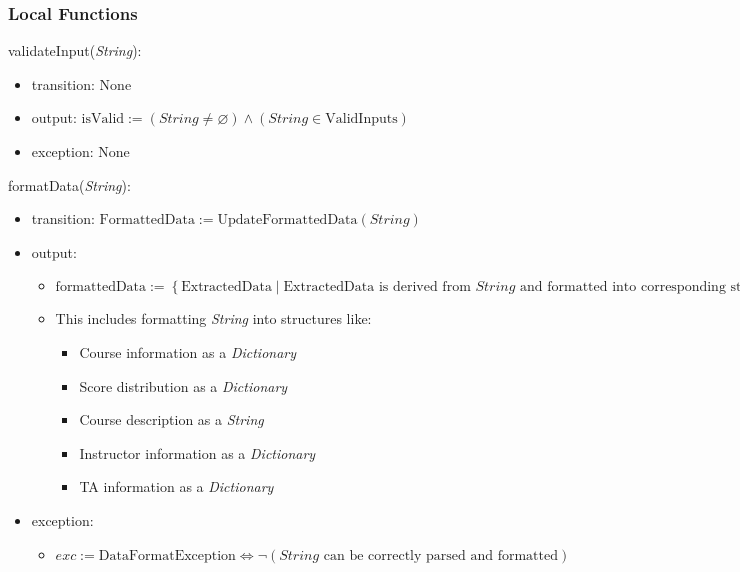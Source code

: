 \documentclass[12pt, titlepage]{article}
\begin{document}
\subsubsection{Local Functions}

\noindent validateInput(\textit{String}):
\begin{itemize}
\item transition: None
\item output: \( \text{isValid} := (\textit{String} \neq \varnothing) \land (\textit{String} \in \text{ValidInputs}) \)
\item exception: None
\end{itemize}

\noindent formatData(\textit{String}):
\begin{itemize}
\item transition: \( \text{FormattedData} := \text{UpdateFormattedData}(\textit{String}) \)
\item output: 
    \begin{itemize}
        \item \( \text{formattedData} := \left\{ \text{ExtractedData} \mid \text{ExtractedData} \text{ is derived from } \textit{String} \text{ and formatted into corresponding structures} \right\} \)
        \item This includes formatting \textit{String} into structures like:
            \begin{itemize}
                \item Course information as a \textit{Dictionary}
                \item Score distribution as a \textit{Dictionary}
                \item Course description as a \textit{String}
                \item Instructor information as a \textit{Dictionary}
                \item TA information as a \textit{Dictionary}
            \end{itemize}
    \end{itemize}
\item exception: 
    \begin{itemize}
        \item \( exc := \text{DataFormatException} \iff \lnot (\textit{String} \text{ can be correctly parsed and formatted}) \)
    \end{itemize}
\end{itemize}
\end{document}
